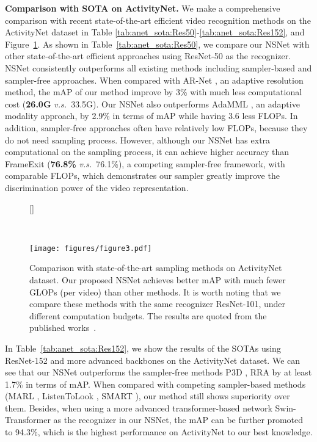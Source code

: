 \documentclass[runningheads]{llncs}
\newcommand{\figref}[1]{Figure~\ref{#1}}
\newcommand{\tabref}[1]{Table~\ref{#1}}
\def\vs{\emph{v.s.~}}
\begin{document}
\noindent\textbf{Comparison with SOTA on ActivityNet.}
We make a comprehensive comparison with recent state-of-the-art efficient video recognition methods on the ActivityNet dataset in Table \ref{tab:anet_sota:Res50}-\ref{tab:anet_sota:Res152}, and \figref{fig:anet_res101}. 
As shown in \tabref{tab:anet_sota:Res50}, we compare our NSNet with other state-of-the-art efficient approaches using ResNet-50 as the recognizer. NSNet consistently outperforms all existing methods including sampler-based and sampler-free approaches.
When compared with AR-Net \cite{arnet}, an adaptive resolution method, the mAP of our method improve by 3\% with much less computational cost (\textbf{26.0G} \vs 33.5G). Our NSNet also outperforms AdaMML \cite{adamml}, an adaptive modality approach, by 2.9\% in terms of mAP while having 3.6 less FLOPs. In addition, sampler-free approaches often have relatively low FLOPs, because they do not need sampling process.
However, although our NSNet has extra computational on the sampling process, it can achieve higher accuracy than FrameExit \cite{frameexit}(\textbf{76.8\%} \vs 76.1\%), a competing sampler-free framework, with comparable FLOPs, which demonstrates our sampler greatly improve the discrimination power of the video representation. 
\begin{figure}[h]
[\FBwidth]
{\caption{Comparison with state-of-the-art sampling methods on ActivityNet dataset. 
Our proposed NSNet achieves better mAP with much fewer GLOPs (per video) than other methods. It is worth noting that we compare these methods with the same recognizer ResNet-101, under different computation budgets. The results are quoted from the published works~\cite{listentolook,arnet}.}~\label{fig:anet_res101}
      }
{\texttt{[image: figures/figure3.pdf]}}
\end{figure}
In \tabref{tab:anet_sota:Res152}, we show the results of the SOTAs using ResNet-152 and more advanced backbones on the ActivityNet dataset. We can see that our NSNet outperforms the sampler-free methods P3D \cite{p3d}, RRA \cite{rra} by at least 1.7\% in terms of mAP. When compared with competing sampler-based methods (MARL \cite{marl}, ListenToLook \cite{listentolook}, SMART \cite{smart2020}), our method still shows superiority over them. Besides, when using a more advanced transformer-based network Swin-Transformer \cite{swintransformer} as the recognizer in our NSNet, the mAP can be further promoted to 94.3\%, which is the highest performance on ActivityNet to our best knowledge.
 
\end{document}

